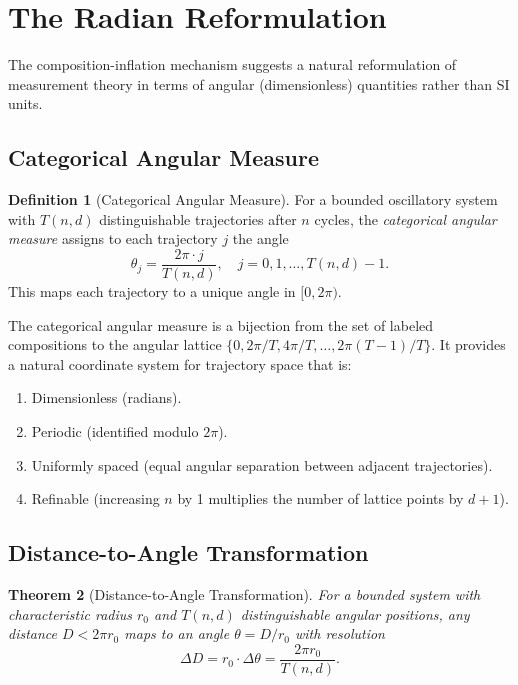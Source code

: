 \documentclass[twocolumn,10pt,a4paper]{article}
\newtheorem{theorem}{Theorem}[section]
\theoremstyle{definition}
\newtheorem{definition}[theorem]{Definition}
\theoremstyle{remark}
\begin{document}
\section{The Radian Reformulation}
\label{sec:radian}

The composition-inflation mechanism suggests a natural reformulation of measurement theory in terms of angular (dimensionless) quantities rather than SI units.

\subsection{Categorical Angular Measure}

\begin{definition}[Categorical Angular Measure]
\label{def:cam}
For a bounded oscillatory system with $T(n,d)$ distinguishable trajectories after $n$ cycles, the \emph{categorical angular measure} assigns to each trajectory $j$ the angle
\begin{equation}
\theta_j = \frac{2\pi \cdot j}{T(n,d)}, \quad j = 0, 1, \ldots, T(n,d) - 1.
\end{equation}
This maps each trajectory to a unique angle in $[0, 2\pi)$.
\end{definition}

The categorical angular measure is a bijection from the set of labeled compositions to the angular lattice $\{0, 2\pi/T, 4\pi/T, \ldots, 2\pi(T-1)/T\}$. It provides a natural coordinate system for trajectory space that is:
\begin{enumerate}[label=(\roman*)]
\item Dimensionless (radians).
\item Periodic (identified modulo $2\pi$).
\item Uniformly spaced (equal angular separation between adjacent trajectories).
\item Refinable (increasing $n$ by 1 multiplies the number of lattice points by $d+1$).
\end{enumerate}

\subsection{Distance-to-Angle Transformation}

\begin{theorem}[Distance-to-Angle Transformation]
\label{thm:distance_angle}
For a bounded system with characteristic radius $r_0$ and $T(n,d)$ distinguishable angular positions, any distance $D < 2\pi r_0$ maps to an angle $\theta = D / r_0$ with resolution
\begin{equation}
\Delta D = r_0 \cdot \Delta\theta = \frac{2\pi r_0}{T(n,d)}.
\end{equation}
\end{theorem}
\end{document}
